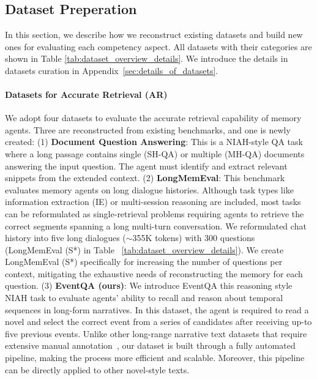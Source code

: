 \section{\ours}

\subsection{Dataset Preperation}
In this section, we describe how we reconstruct existing datasets and build new ones for evaluating each competency aspect. All datasets with their categories are shown in Table \ref{tab:dataset_overview_details}. We introduce the details in datasets curation in Appendix~\ref{sec:details_of_datasets}. 

\vspace{-8pt}
\paragraph{Datasets for Accurate Retrieval (AR)}
We adopt four datasets to evaluate the accurate retrieval capability of memory agents. Three are reconstructed from existing benchmarks, and one is newly created: (1) \textbf{Document Question Answering}: This is a NIAH-style QA task where a long passage contains single (SH-QA) or multiple (MH-QA) documents answering the input question. The agent must identify and extract relevant snippets from the extended context. (2) \textbf{LongMemEval}: This benchmark evaluates memory agents on long dialogue histories. Although task types like information extraction (IE) or multi-session reasoning are included, most tasks can be reformulated as single-retrieval problems requiring agents to retrieve the correct segments spanning a long multi-turn conversation. We reformulated chat history into five long dialogues ($\sim$355K tokens) with 300 questions (LongMemEval (S*) in Table ~\ref{tab:dataset_overview_details}). We create LongMemEval (S*) specifically for increasing the number of questions per context, mitigating the exhaustive needs of reconstructing the memory for each question. (3) \textbf{EventQA (ours)}: We introduce EventQA this reasoning style NIAH task to evaluate agents’ ability to recall and reason about temporal sequences in long-form narratives. In this dataset, the agent is required to read a novel and select the correct event from a series of candidates after receiving up-to five previous events. Unlike other long-range narrative text datasets that require extensive manual annotation~\citep{infinitebench, detectiveqa}, our dataset is built through a fully automated pipeline, making the process more efficient and scalable. Moreover, this pipeline can be directly applied to other novel-style texts. 


